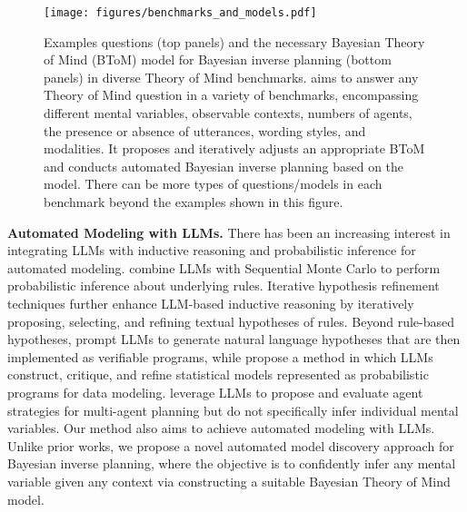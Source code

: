 \begin{figure*}[ht]
  \centering
  \texttt{[image: figures/benchmarks\_and\_models.pdf]}
    \vspace{-15pt}
  \caption{Examples questions (top panels) and the necessary Bayesian Theory of Mind (BToM) model for Bayesian inverse planning (bottom panels) in diverse Theory of Mind benchmarks. \ours aims to answer any Theory of Mind question in a variety of benchmarks, encompassing different mental variables, observable contexts, numbers of agents, the presence or absence of utterances, wording styles, and modalities. It proposes and iteratively adjusts an appropriate BToM and conducts automated Bayesian inverse planning based on the model.
  There can be more types of questions/models in each benchmark beyond the examples shown in this figure.}
  \label{fig:benchmarks_and_models}
  \vspace{-10pt}
\end{figure*}



\textbf{Automated Modeling with LLMs.} There has been an increasing interest in integrating LLMs with inductive reasoning and probabilistic inference for automated modeling. \citet{piriyakulkij2024doing} combine LLMs with Sequential Monte Carlo to perform probabilistic inference about underlying rules. Iterative hypothesis refinement techniques \citep{qiu2023phenomenal} further enhance LLM-based inductive reasoning by iteratively proposing, selecting, and refining textual hypotheses of rules. Beyond rule-based hypotheses, \citet{wang2023hypothesis} prompt LLMs to generate natural language hypotheses that are then implemented as verifiable programs, while \citet{li2024automated} propose a method in which LLMs construct, critique, and refine statistical models represented as probabilistic programs for data modeling. \citet{cross2024hypothetical} leverage LLMs to propose and evaluate agent strategies for multi-agent planning but do not specifically infer individual mental variables. Our method also aims to achieve automated modeling with LLMs. Unlike prior works, we propose a novel automated model discovery approach for Bayesian inverse planning, where the objective is to confidently infer any mental variable given any context via constructing a suitable Bayesian Theory of Mind model.